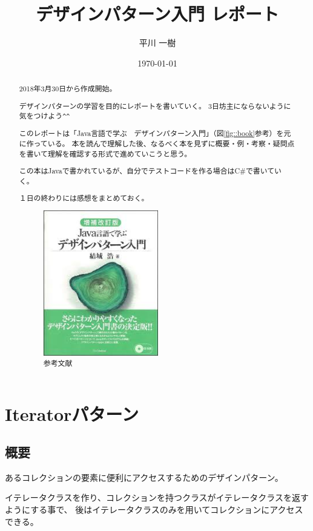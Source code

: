 \documentclass[11pt]{jsarticle}
\title{デザインパターン入門 レポート}
\author{平川 一樹}
\date{\today}
\begin{document}
	\maketitle
	
	\begin{abstract}
		2018年3月30日から作成開始。
		
		デザインパターンの学習を目的にレポートを書いていく。
		3日坊主にならないように気をつけよう\verb|^^|
		
		このレポートは「Java言語で学ぶ　デザインパターン入門」（図\ref{fig::book}参考）を元に作っている。
		本を読んで理解した後、なるべく本を見ずに概要・例・考察・疑問点を書いて理解を確認する形式で進めていこうと思う。
		
		この本はJavaで書かれているが、自分でテストコードを作る場合はC\#で書いていく。
		
		１日の終わりには感想をまとめておく。
		\begin{figure}[htbp]
			\centering
			\includegraphics[width = 5cm, bb = 0 0 199 253]{book.jpg}
			\caption{参考文献}\label{fig::book}
		\end{figure}
	\end{abstract}
	
	\clearpage
	\tableofcontents
	\clearpage
	
	\section{Iteratorパターン}
	\subsection{概要}
		あるコレクションの要素に便利にアクセスするためのデザインパターン。
		
		イテレータクラスを作り、コレクションを持つクラスがイテレータクラスを返すようにする事で、
		後はイテレータクラスのみを用いてコレクションにアクセスできる。
		
\end{document}
